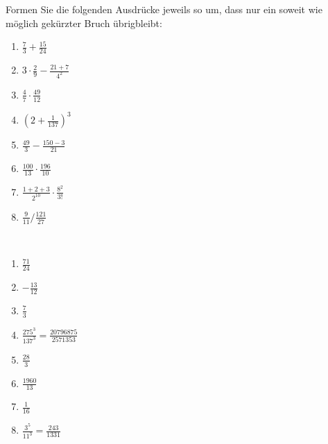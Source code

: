 \documentclass[12pt]{exam}
\begin{document}
\begin{questions}
Formen Sie die folgenden Ausdrücke jeweils so um, dass nur ein soweit wie möglich gekürzter Bruch übrigbleibt:\\
\parbox{0.5\textwidth}{\begin{enumerate}
		\item $\frac{7}{3}+\frac{15}{24}$
		\item $3\cdot\frac{2}{9}-\frac{21+7}{4^2}$
		\item $\frac{4}{7}\cdot\frac{49}{12}$
		\item $\left(2+\frac{1}{137}\right)^3$
\end{enumerate}}\parbox{0.5\textwidth}{\begin{enumerate}\setcounter{enumi}{4}
		\item $\frac{49}{3}-\frac{150-3}{21}$
		\item $\frac{100}{13}\cdot\frac{196}{10}$
		\item $\frac{1+2+3}{2^{10}}\cdot\frac{8^2}{3!}$
		\item $\frac{9}{11}/\frac{121}{27}$
\end{enumerate}}
\begin{solution}\\
	\parbox{0.5\textwidth}{\begin{enumerate}
			\item $\frac{71}{24}$
			\item $-\frac{13}{12}$
			\item $\frac{7}{3}$
			\item $\frac{275^3}{137^3}=\frac{20796875}{2571353}$
	\end{enumerate}}\parbox{0.5\textwidth}{\begin{enumerate}\setcounter{enumi}{4}
			\item $\frac{28}{3}$
			\item $\frac{1960}{13}$
			\item $\frac{1}{16}$
			\item $\frac{3^5}{11^3}=\frac{243}{1331}$
	\end{enumerate}}
\end{solution}





\end{questions}
\end{document}
